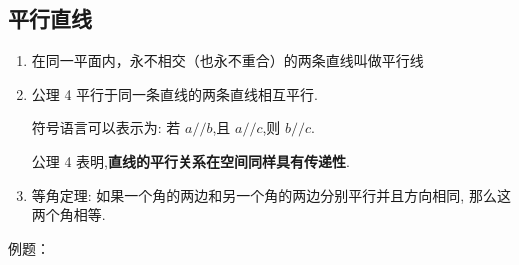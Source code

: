 \subsection*{平行直线}
\begin{enumerate}
    \item 在同一平面内，永不相交（也永不重合）的两条直线叫做平行线
    \item 公理 4 平行于同一条直线的两条直线相互平行.

    符号语言可以表示为: 若 $a//b$,且 $a//c$,则 $b//c$. 
    
    公理 4 表明,\textbf{直线的平行关系在空间同样具有传递性}.
    
    \item 等角定理: 如果一个角的两边和另一个角的两边分别平行并且方向相同, 那么这两个角相等.

\end{enumerate}
例题：
